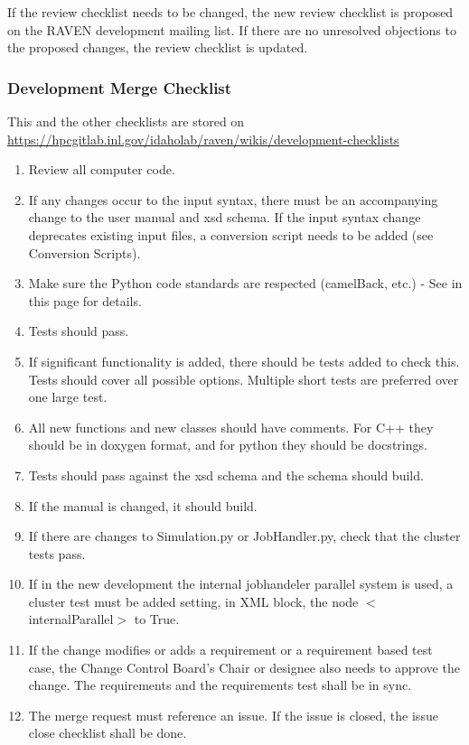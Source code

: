 \documentclass{article}
\begin{document}
If the review checklist needs to be changed, the new review checklist
is proposed on the RAVEN development mailing list.  If there are no
unresolved objections to the proposed changes, the review checklist is
updated.

\subsubsection{Development Merge Checklist}

This and the other checklists are stored on \url{https://hpcgitlab.inl.gov/idaholab/raven/wikis/development-checklists}

\begin{enumerate}
\item    Review all computer code.
\item    If any changes occur to the input syntax, there must be an accompanying change to the user manual and xsd schema. If the input syntax change deprecates existing input files, a conversion script needs to be added (see Conversion Scripts).
\item    Make sure the Python code standards are respected (camelBack, etc.) - See in this page for details.
\item    Tests should pass.
\item    If significant functionality is added, there should be tests added to check this. Tests should cover all possible options. Multiple short tests are preferred over one large test.
\item    All new functions and new classes should have comments. For C++ they should be in doxygen format, and for python they should be docstrings.
\item    Tests should pass against the xsd schema and the schema should build.
\item    If the manual is changed, it should build.
\item    If there are changes to Simulation.py or JobHandler.py, check that the cluster tests pass.
\item    If in the new development the internal jobhandeler parallel system is used, a cluster test must be added setting, in XML block, the node $<$internalParallel$>$ to True.
\item If the change modifies or adds a requirement or a requirement based test case, the Change Control Board's Chair or designee also needs to approve the change. The requirements and the requirements test shall be in sync.
\item The merge request must reference an issue. If the issue is closed, the issue close checklist shall be done.
\end{enumerate}
\end{document}
